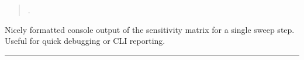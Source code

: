 \documentclass[letterpaper,10pt,english]{sphinxmanual}
\begin{document}
\begin{fulllineitems}
\begin{fulllineitems}
\begin{quote}
\begin{description}
\sphinxAtStartPar
{}.

\end{description}\end{quote}

\end{fulllineitems}


\begin{fulllineitems}
\label{\detokenize{results:SensitivityData.print_matrix_at_step}}
\pysigstartsignatures
\pysiglinewithargsret
{}
{\sphinxparamcomma {}\sphinxparamcomma {}}
{}
\pysigstopsignatures
\sphinxAtStartPar
Nicely formatted console output of the sensitivity matrix for a single
sweep step.  Useful for quick debugging or CLI reporting.

\end{fulllineitems}


\end{fulllineitems}



\bigskip\hrule\bigskip

\end{document}
